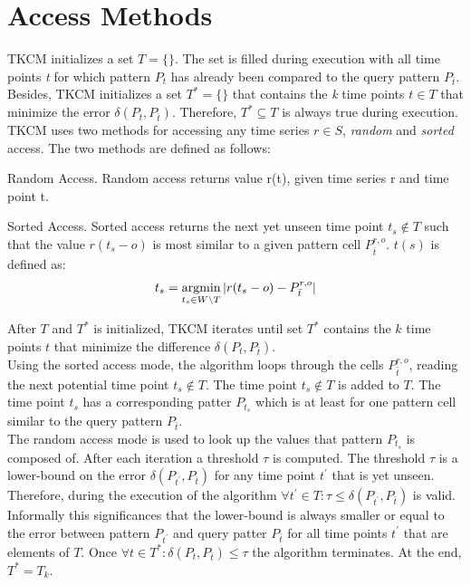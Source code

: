 \documentclass[abstracton,12pt]{scrreprt}
\begin{document}
\section{Access Methods}
\label{AccessMethods}
TKCM initializes a set $T =\{\}$. The set is filled during execution with all time points \emph{t} for which pattern $P_t$ has already been compared to the query pattern $P_{\bar{t}}$. Besides, TKCM initializes a set $T^*=\{\}$ that contains the \emph{k} time points $t \in T$ that minimize the error $\delta(P_{t}, P_{\bar{t}})$. Therefore, $T^* \subseteq T$ is always true during execution. 
\\TKCM uses two methods for accessing any time series $r \in S$, \emph{random} and \emph{sorted} access. The two methods are defined as follows: 
\begin{defn}
	Random Access. Random access returns value r(t), given time series r and time point t.	
\end{defn}
\begin{defn}
	Sorted Access. Sorted access returns the next yet unseen time point $t_s \notin T$ such that the value $r(t_s-o)$ is most similar to a given pattern cell $P_{\bar{t}}^{r,o}$. $t(s)$ is defined as:
	\begin{align*}
	t_s = \argmin_{t_s \in W \setminus T} |r(t_s-o) - P_{\bar{t}}^{r,o}|
	\end{align*}
\end{defn}
After $T$ and $T^*$ is initialized, TKCM iterates until set $T^*$ contains the $k$ time points $t$ that minimize the difference $\delta(P_{t}, P_{\bar{t}})$. \\Using the sorted access mode, the algorithm loops through the cells $P_{\bar{t}}^{r,o}$, reading the next potential time point $t_s \notin T$. The time point $t_s \notin T$ is added to $T$. The time point $t_s$ has a corresponding patter $P_{t_s}$ which is at least for one pattern cell similar to the query pattern $P_{\bar{t}}$. \\
The random access mode is used to look up the values that pattern $P_{t_s}$ is composed of. After each iteration a threshold $\tau$ is computed. The threshold $\tau$ is a lower-bound on the error $\delta (P_{t^{'}}, P_{\bar{t}})$ for any time point $t^{'}$ that is yet unseen. Therefore, during the execution of the algorithm
$\forall t^{'} \in T : \tau \leq \delta(P_{t^{'}}, P_{\bar{t}}) $ is valid. Informally this significances that the lower-bound is always smaller or equal to the error between pattern $P_{t^{'}}$ and query patter $P_{\bar{t}}$ for all time points $t^{'}$ that are elements of $T$. Once $\forall t \in T^* : \delta(P_{t}, P_{\bar{t}}) \leq \tau$ the algorithm terminates. At the end, $T^*=T_k$.
\end{document}
